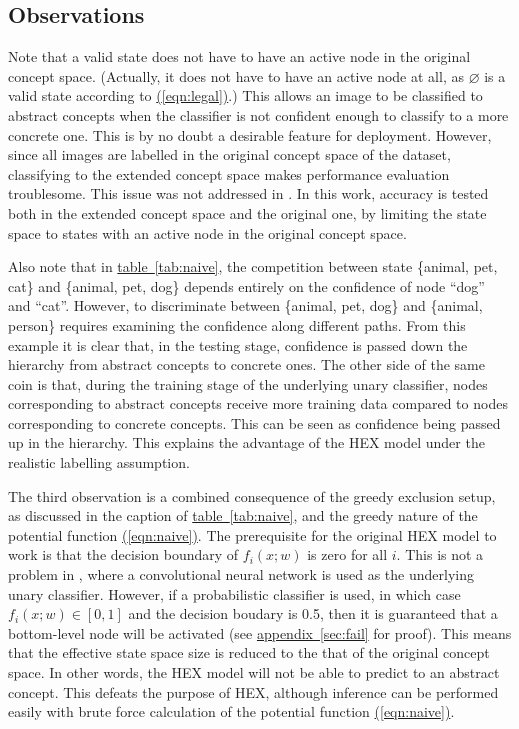 \documentclass[11pt,a4paper]{article}
\begin{document}
\subsection{Observations}
\label{sec:observ}

Note that a valid state does not have to have an active node in the original concept space. (Actually, it does not have to have an active node at all, as $\varnothing$ is a valid state according to \hyperref[eqn:legal]{(\ref{eqn:legal})}.) This allows an image to be classified to abstract concepts when the classifier is not confident enough to classify to a more concrete one. This is by no doubt a desirable feature for deployment. However, since all images are labelled in the original concept space of the dataset, classifying to the extended concept space makes performance evaluation troublesome. This issue was not addressed in \cite{deng2014large}. In this work, accuracy is tested both in the extended concept space and the original one, by limiting the state space to states with an active node in the original concept space.

Also note that in \hyperref[tab:naive]{table~\ref{tab:naive}}, the competition between state \{animal, pet, cat\} and \{animal, pet, dog\} depends entirely on the confidence of node ``dog'' and ``cat''. However, to discriminate between \{animal, pet, dog\} and \{animal, person\} requires examining the confidence along different paths. From this example it is clear that, in the testing stage, confidence is passed down the hierarchy from abstract concepts to concrete ones. The other side of the same coin is that, during the training stage of the underlying unary classifier, nodes corresponding to abstract concepts receive more training data compared to nodes corresponding to concrete concepts. This can be seen as confidence being passed up in the hierarchy. This explains the advantage of the HEX model under the realistic labelling assumption.

The third observation is a combined consequence of the greedy exclusion setup, as discussed in the caption of \hyperref[tab:naive]{table~\ref{tab:naive}}, and the greedy nature of the potential function \hyperref[eqn:naive]{(\ref{eqn:naive})}. The prerequisite for the original HEX model to work is that the decision boundary of $f_i(x;w)$ is zero for all $i$. This is not a problem in \cite{deng2014large}, where a convolutional neural network \cite{krizhevsky2012imagenet} is used as the underlying unary classifier. However, if a probabilistic classifier is used, in which case $f_i(x;w)\in[0,1]$ and the decision boudary is 0.5, then it is guaranteed that a bottom-level node will be activated (see \hyperref[sec:fail]{appendix~\ref{sec:fail}} for proof). This means that the effective state space size is reduced to the that of the original concept space. In other words, the HEX model will not be able to predict to an abstract concept. This defeats the purpose of HEX, although inference can be performed easily with brute force calculation of the potential function \hyperref[eqn:naive]{(\ref{eqn:naive})}.
\end{document}
